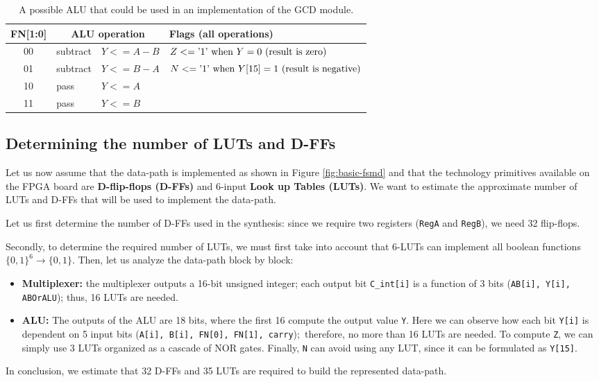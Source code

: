 \begin{table}[H]
\centering
\begin{tabular}{|c|l|l||l|}
\hline
FN[1:0] & \multicolumn{2}{c||}{ALU operation} & Flags (all operations) \\
\hline\hline
00 & subtract & $Y <= A - B$ & $Z <= \text{'1' \text{when} } Y = 0 \text{ (result is zero)}$ \\
01 & subtract & $Y <= B - A$ & $N <= \text{'1' \text{when} } Y[15] = 1 \text{ (result is negative)}$ \\
10 & pass     & $Y <= A$     & \\
11 & pass     & $Y <= B$     & \\
\hline
\end{tabular}
\caption{A possible ALU that could be used in an implementation of the GCD module.}
\label{tab:alu_gcd}
\end{table}

\subsection{Determining the number of LUTs and D-FFs}
\label{resources-estimate}

Let us now assume that the data-path is implemented as shown in Figure \ref{fig:basic-fsmd} and that the technology primitives available on the FPGA board are \textbf{D-flip-flops (D-FFs)} and 6-input \textbf{Look up Tables (LUTs)}. We want to estimate the approximate number of LUTs and D-FFs that will be used to implement the data-path.

Let us first determine the number of D-FFs used in the synthesis: since we require two registers (\texttt{RegA} and \texttt{RegB}), we need 32 flip-flops.

Secondly, to determine the required number of LUTs, we must first take into account that 6-LUTs can implement all boolean functions $\{0,1\}^6\rightarrow \{0,1\}$. Then, let us analyze the data-path block by block:
\begin{itemize}
    \item \textbf{Multiplexer:} the multiplexer outputs a 16-bit unsigned integer; each output bit \texttt{C\_int[i]} is a function of 3 bits (\texttt{AB[i], Y[i], ABOrALU}); thus, 16 LUTs are needed.
    \item \textbf{ALU:} The outputs of the ALU are 18 bits, where the first 16 compute the output value \texttt{Y}. Here we can observe how each bit \texttt{Y[i]} is dependent on 5 input bits (\texttt{A[i], B[i], FN[0], FN[1], carry});\, therefore, no more than 16 LUTs are needed. To compute \texttt{Z}, we can simply use 3 LUTs organized as a cascade of NOR gates. Finally, \texttt{N} can avoid using any LUT, since it can be formulated as \texttt{Y[15]}.
\end{itemize}
In conclusion, we estimate that 32 D-FFs and 35 LUTs are required to build the represented data-path.
